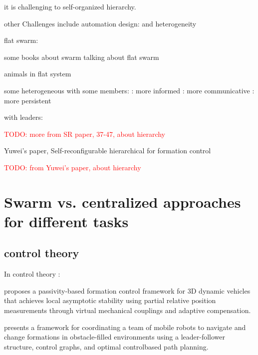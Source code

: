 \cite{dorigo2020reflections} it is challenging to self-organized hierarchy.

other Challenges include automation design:
\cite{francesca2016automatic}
\cite{birattari2019automatic}
\cite{salman2024automatic}
and heterogeneity 
\cite{kengyel2015potential}

flat swarm:
\cite{viragh2014flocking}
\cite{vasarhelyi2018optimized}

some books about swarm talking about flat swarm
\cite{beni1988concept}
\cite{bonabeau1999swarm}
\cite{csahin2004swarm}
\cite{floreano2008bio}

animals in flat system
\cite{buhl2006disorder}
\cite{detrain2008collective}
\cite{theraulaz1998origin}

some heterogeneous with some members:
\cite{firat2020self} : more informed 
\cite{valentini2016collective} : more communicative
\cite{balazs2020adaptive} : more persistent

with leaders:
\cite{gu2009leader}
\cite{amraii2014explicit}
\cite{zheng2020adversarial}
\cite{shan2020collective}
\cite{kaiser2022innate}

\textcolor{red}{TODO: more from SR paper, 37-47, about hierarchy}

\cite{zhang2023self} Yuwei's paper, Self-reconfigurable hierarchical for formation control

\textcolor{red}{TODO: from Yuwei's paper, about hierarchy}

\section{Swarm vs. centralized approaches for different tasks}

\subsection{control theory}

In control theory :

\cite{stacey2015passivity} proposes a passivity-based formation control framework for 3D dynamic vehicles that achieves local asymptotic stability using partial relative position measurements through virtual mechanical couplings and adaptive compensation.

\cite{desai1999control} presents a framework for coordinating a team of mobile robots to navigate and change formations in obstacle-filled environments using a leader-follower structure, control graphs, and optimal control\-based path planning.


